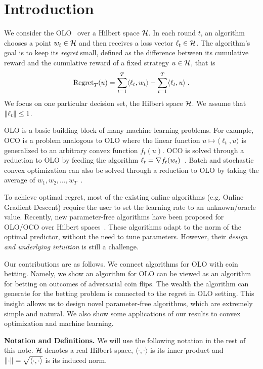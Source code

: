 \section{Introduction}
\label{section:introduction}

We consider the \ac{OLO}~\citep{Cesa-Bianchi-Lugosi-2006, Shalev-Shwartz-2011}
over a Hilbert space $\mathcal{H}$. In each round $t$, an algorithm chooses a point $w_t
\in \mathcal{H}$ and then receives a loss vector $\ell_t \in \mathcal{H}$. The algorithm's goal is
to keep its \emph{regret} small, defined as the difference between its
cumulative reward and the cumulative reward of a fixed strategy $u \in \mathcal{H}$,
that is
\[
\operatorname{Regret}_T(u) = \sum_{t=1}^T \langle \ell_t, w_t \rangle - \sum_{t=1}^T \langle \ell_t, u \rangle  \; .
\]
We focus on one particular decision set, the Hilbert space $\mathcal{H}$.  We assume
that $\left\|{\ell_t}\right\| \le 1$.

\ac{OLO} is a basic building block of many machine learning problems. For
example, \ac{OCO} is a problem analogous to \ac{OLO} where
the linear function $u \mapsto \langle \ell_t, u \rangle$
is generalized to an arbitrary convex function $f_t(u)$. \ac{OCO} is solved
through a reduction to \ac{OLO} by feeding the algorithm $\ell_t = \nabla
f_t(w_t)$~\citep{Shalev-Shwartz-2011}.  Batch and stochastic convex
optimization can also be solved through a reduction to \ac{OLO} by
taking the average of $w_1, w_2, \dots, w_T$~\citep{Shalev-Shwartz-2011}.

To achieve optimal regret, most of the existing online algorithms (e.g.  Online
Gradient Descent) require the user to set the learning rate to an
unknown/oracle value. Recently, new parameter-free algorithms have been
proposed for \ac{OLO}/\ac{OCO} over Hilbert
spaces~\citep{Streeter-McMahan-2012, Orabona-2013, McMahan-Abernethy-2013,
McMahan-Orabona-2014, Orabona-2014}.  These algorithms adapt to the norm of the
optimal predictor, without the need to tune parameters. However, their
\emph{design and underlying intuition} is still a challenge.

Our contributions are as follows. We connect algorithms for \ac{OLO} with coin
betting. Namely, we show an algorithm for \ac{OLO} can be viewed as an
algorithm for betting on outcomes of adversarial coin flips. The wealth the
algorithm can generate for the betting problem is connected to the regret in
\ac{OLO} setting. This insight allows us to design novel parameter-free
algorithms, which are extremely simple and natural. We also show some
applications of our results to convex optimization and machine learning.

\noindent\textbf{Notation and Definitions.}
We will use the following notation in the rest of this note.  $\mathcal{H}$ denotes
a real Hilbert space, $\langle \cdot, \cdot \rangle$ is its inner product and
$\left\|{\cdot}\right\| = \sqrt{\langle \cdot, \cdot \rangle}$ is its induced norm.
